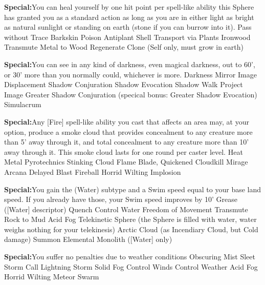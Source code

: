\textbf{Special:}{You can heal yourself by one hit point per spell-like ability this Sphere has granted you as a standard action as long as you are in either light as bright as natural sunlight or standing on earth (stone if you can burrow into it).}
\sphere
{Pass without Trace}
{Barkskin}
{Poison}
{Antiplant Shell}
{Transport via Plants}
{Ironwood}
{Transmute Metal to Wood}
{Regenerate}
{Clone (Self only, must grow in earth)}

\textbf{Special:}{You can see in any kind of darkness, even magical darkness, out to 60', or 30' more than you normally could, whichever is more.}
\sphere
{Darkness}
{Mirror Image}
{Displacement}
{Shadow Conjuration}
{Shadow Evocation}
{Shadow Walk}
{Project Image}
{Greater Shadow Conjuration (specical bonus: Greater Shadow Evocation)}
{Simulacrum}

\textbf{Special:}{Any [Fire] spell-like ability you cast that affects an area may, at your option, produce a smoke cloud that provides concealment to any creature more than 5' away through it, and total concealment to any creature more than 10' away through it. This smoke cloud lasts for one round per caster level.}
\sphere
{Heat Metal}
{Pyrotechnics}
{Stinking Cloud}
{Flame Blade, Quickened}
{Cloudkill}
{Mirage Arcana}
{Delayed Blast Fireball}
{Horrid Wilting}
{Implosion}



\textbf{Special:}{You gain the (Water) subtype and a Swim speed equal to your base land speed. If you already have those, your Swim speed improves by 10'}
\sphere
{Grease ([Water] descriptor)}
{Quench}
{Control Water}
{Freedom of Movement}
{Transmute Rock to Mud}
{Acid Fog}
{Telekinetic Sphere (the Sphere is filled with water, water weighs nothing for your telekinesis)}
{Arctic Cloud (as Incendiary Cloud, but Cold damage)}
{Summon Elemental Monolith ([Water] only)}

\textbf{Special:}{You suffer no penalties due to weather conditions}
\sphere
{Obscuring Mist}
{Sleet Storm}
{Call Lightning Storm}
{Solid Fog}
{Control Winds}
{Control Weather}
{Acid Fog}
{Horrid Wilting}
{Meteor Swarm}
